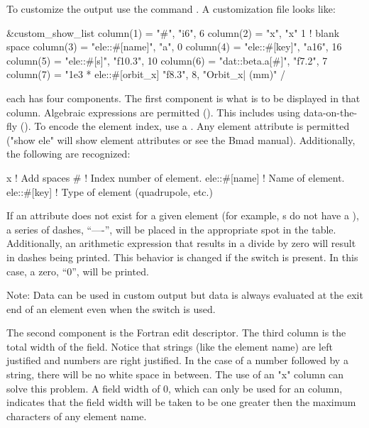 {To customize the output use the command . A customization file looks like:
\begin{example}
  &custom_show_list
    column(1) = "#",                     "i6",     6 
    column(2) = "x",                     "x"       1       ! blank space
    column(3) = "ele::#[name]",          "a",      0
    column(4) = "ele::#[key]",           "a16",   16
    column(5) = "ele::#[s]",             "f10.3", 10
    column(6) = "dat::beta.a[#]",        "f7.2",   7
    column(7) = "1e3 * ele::#[orbit_x]   "f8.3",   8, "Orbit_x| (mm)" 
  /
\end{example}
each  has four components. The first component is what
is to be displayed in that column. Algebraic expressions are permitted
(). This includes using data-on-the-fly
(). To encode the element index, use a \vn{\#}.
Any element attribute is permitted ("show ele" will show element
attributes or see the Bmad manual). Additionally, the following are
recognized:
\begin{example}
  x                           ! Add spaces
  #                           ! Index number of element.
  ele::#[name]                ! Name of element.
  ele::#[key]                 ! Type of element (quadrupole, etc.)
\end{example}
If an attribute does not exist for a given element (for example,
s do not have a ), a series of dashes,
``----'', will be placed in the appropriate spot in the table.
Additionally, an arithmetic expression that results in a divide by
zero will result in dashes being printed. This behavior is changed if
the  switch is present. In this case, a zero, ``0'', will
be printed.

Note: Data can be used in custom output but data is always evaluated at
the exit end of an element even when the  switch is used.

The second component is the Fortran edit descriptor. The third column
is the total width of the field. Notice that strings (like the element
name) are left justified and numbers are right justified. In the case
of a number followed by a string, there will be no white space in
between. The use of an "x" column can solve this problem. A field
width of 0, which can only be used for an  column,
indicates that the field width will be taken to be one greater then
the maximum characters of any element name.

}
